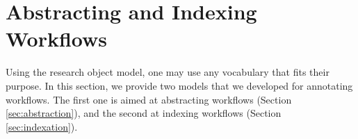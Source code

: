 \section{Abstracting and Indexing Workflows}
\label{sec:abstract-indexing}

Using the research object model, one may use any vocabulary that fits their purpose. In this section, we provide two models that we developed for annotating workflows. The first one is aimed at abstracting workflows (Section \ref{sec:abstraction}), and the second at  indexing workflows (Section \ref{sec:indexation}).